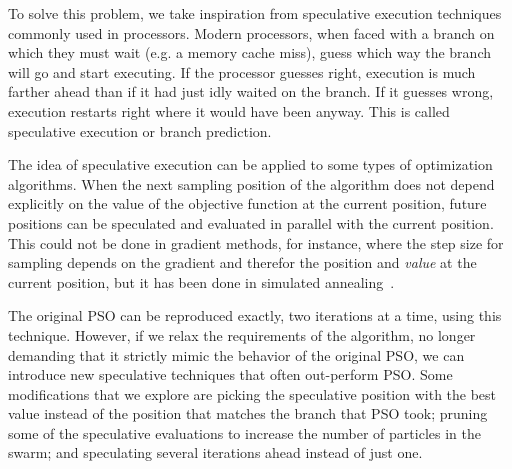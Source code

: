 \documentclass[journal,letterpaper]{IEEEtran}
\begin{document}
To solve this problem, we take inspiration from speculative execution
techniques commonly used in processors.  Modern processors, when faced with a
branch on which they must wait (e.g. a memory cache miss), guess which way the
branch will go and start executing.  If the processor guesses right, execution
is much farther ahead than if it had just idly waited on the branch.  If it
guesses wrong, execution restarts right where it would have been anyway.  This
is called speculative execution or branch prediction.

The idea of speculative execution can be applied to some types of optimization
algorithms.  When the next sampling position of the algorithm does not depend
explicitly on the value of the objective function at the current position,
future positions can be speculated and evaluated in parallel with the current
position.  This could not be done in gradient methods, for instance, where the
step size for sampling depends on the gradient and therefor the position and \emph{value}
at the current position, but it
has been done in simulated annealing~\cite{witte-tpds91}.

% 
% 

The original PSO can be reproduced exactly, two iterations at a time, using
this technique.  However, if we relax the requirements of the algorithm, no
longer demanding that it strictly mimic the behavior of the original PSO, we
can introduce new speculative techniques that often out-perform PSO.  Some
modifications that we explore are picking the speculative position with the
best value instead of the position that matches the branch that PSO took;
pruning some of the speculative evaluations to increase the number of particles
in the swarm; and speculating several iterations ahead instead of just one.
\end{document}
